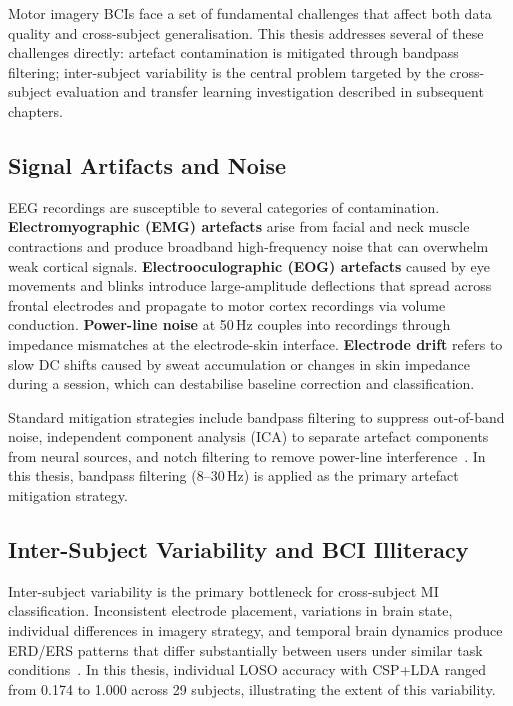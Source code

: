 \documentclass[english, bc, kiv, he, iso690alph, pdf]{fasthesis}
\begin{document}
Motor imagery BCIs face a set of fundamental challenges that affect both data quality and cross-subject generalisation. This thesis addresses several of these challenges directly: artefact contamination is mitigated through bandpass filtering; inter-subject variability is the central problem targeted by the cross-subject evaluation and transfer learning investigation described in subsequent chapters.

\subsection{Signal Artifacts and Noise}

EEG recordings are susceptible to several categories of contamination. \textbf{Electromyographic (EMG) artefacts} arise from facial and neck muscle contractions and produce broadband high-frequency noise that can overwhelm weak cortical signals. \textbf{Electrooculographic (EOG) artefacts} caused by eye movements and blinks introduce large-amplitude deflections that spread across frontal electrodes and propagate to motor cortex recordings via volume conduction. \textbf{Power-line noise} at 50\,Hz couples into recordings through impedance mismatches at the electrode-skin interface. \textbf{Electrode drift} refers to slow DC shifts caused by sweat accumulation or changes in skin impedance during a session, which can destabilise baseline correction and classification.

Standard mitigation strategies include bandpass filtering to suppress out-of-band noise, independent component analysis (ICA) to separate artefact components from neural sources, and notch filtering to remove power-line interference~\cite{yadav2025decoding}. In this thesis, bandpass filtering (8--30\,Hz) is applied as the primary artefact mitigation strategy.

\subsection{Inter-Subject Variability and BCI Illiteracy}

Inter-subject variability is the primary bottleneck for cross-subject MI classification. Inconsistent electrode placement, variations in brain state, individual differences in imagery strategy, and temporal brain dynamics produce ERD/ERS patterns that differ substantially between users under similar task conditions~\cite{yadav2025decoding}. In this thesis, individual LOSO accuracy with CSP+LDA ranged from 0.174 to 1.000 across 29 subjects, illustrating the extent of this variability.
\end{document}
